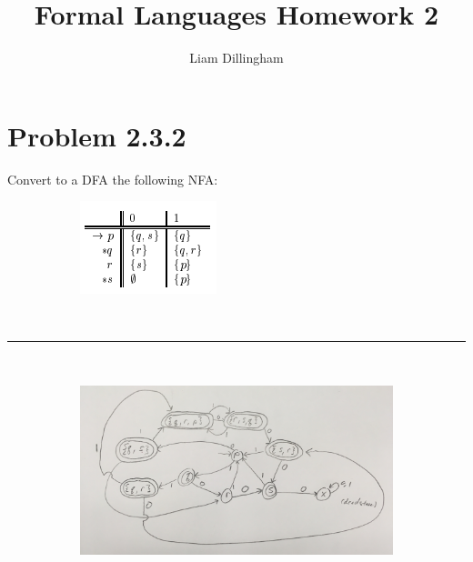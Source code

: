 \documentclass[20pt]{article} %
\title{Formal Languages Homework 2}
\author{Liam Dillingham}
\begin{document}
\maketitle

\section{Problem 2.3.2}
Convert to a DFA the following NFA: 
\begin{figure}[!htbp]
  	\centering
   	\begin{subfigure}[p]{0.25\linewidth}
    	\includegraphics[width=\linewidth]{./figures/HW2fig1.png}
   	\end{subfigure}
\end{figure} \\
\noindent\rule{2cm}{0.4pt} \\
\begin{figure}[!htbp]
  	\centering
   	\begin{subfigure}[p]{1.1\linewidth}
    	\includegraphics[width=\linewidth]{./figures/h2-1.jpg}
   	\end{subfigure}
\end{figure}
\end{document}

